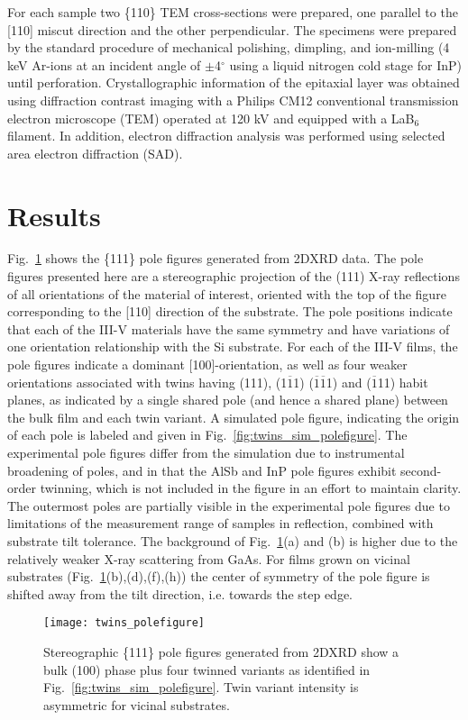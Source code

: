 For each sample two \{110\} TEM cross-sections were prepared, one parallel to the [110] miscut direction and the other perpendicular. The specimens were prepared by the standard procedure of mechanical polishing, dimpling, and ion-milling (4 keV Ar-ions at an incident angle of $\pm$4$^\circ$ using a liquid nitrogen cold stage for InP) until perforation. Crystallographic information of the epitaxial layer was obtained using diffraction contrast imaging with a Philips CM12 conventional transmission electron microscope (TEM) operated at 120 kV and equipped with a LaB$_6$ filament. In addition, electron diffraction analysis was performed using selected area electron diffraction (SAD).
\section{Results}
Fig.~\ref{fig:twins_polefigure} shows the \{111\} pole figures generated from 2DXRD data. The pole figures presented here are a stereographic projection of the (111) X-ray reflections of all orientations of the material of interest, oriented with the top of the figure corresponding to the [110] direction of the substrate. The pole positions indicate that each of the III-V materials have the same symmetry and have variations of one orientation relationship with the Si substrate. For each of the III-V films, the pole figures indicate a dominant [100]-orientation, as well as four weaker orientations associated with twins having (111), (1$\overline{1}$1) ($\overline{1}\overline{1}$1) and ($\overline{1}$11) habit planes, as indicated by a single shared pole (and hence a shared plane) between the bulk film and each twin variant. A simulated pole figure, indicating the origin of each pole is labeled and given in Fig.~\ref{fig:twins_sim_polefigure}. The experimental pole figures differ from the simulation due to instrumental broadening of poles, and in that the AlSb and InP pole figures exhibit second-order twinning, which is not included in the figure in an effort to maintain clarity. The outermost poles are partially visible in the experimental pole figures due to limitations of the measurement range of samples in reflection, combined with substrate tilt tolerance. The background of Fig.~\ref{fig:twins_polefigure}(a) and (b) is higher due to the relatively weaker X-ray scattering from GaAs. For films grown on vicinal substrates (Fig.~\ref{fig:twins_polefigure}(b),(d),(f),(h)) the center of symmetry of the pole figure is shifted away from the tilt direction, i.e. towards the step edge.
\begin{figure}
    \centering
    \texttt{[image: twins\_polefigure]}
    \caption{\label{fig:twins_polefigure}Stereographic \{111\} pole figures generated from 2DXRD show a bulk (100) phase plus four twinned variants as identified in Fig.~\ref{fig:twins_sim_polefigure}. Twin variant intensity is asymmetric for vicinal substrates.}	
\end{figure}

